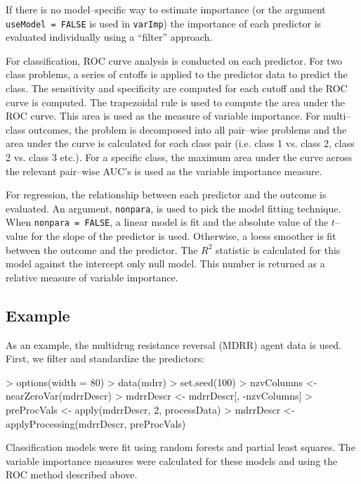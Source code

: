 \documentclass[12pt]{article}
\begin{document}
If there is no model--specific way to estimate importance (or the argument \texttt{useModel = FALSE} is used in \texttt{varImp}) the importance of each predictor is evaluated individually using a ``filter'' approach. 

For classification, ROC curve analysis is conducted on each predictor. For two class problems, a series of cutoffs is applied to the predictor data to predict the class. The sensitivity and specificity are computed for each cutoff and the ROC curve is computed. The trapezoidal rule is used to compute the area under the ROC curve. This area is used as the measure of variable importance. For multi--class outcomes, the problem is decomposed into all pair--wise problems and the area under the curve is calculated for each class pair (i.e. class 1 vs. class 2, class 2 vs. class 3 etc.). For a specific class, the maximum area under the curve across the relevant pair--wise AUC's is used as the variable importance measure.

For regression, the relationship between each predictor and the outcome is evaluated. An argument, \texttt{nonpara}, is used to pick the model fitting technique. When \texttt{nonpara = FALSE}, a linear model is fit and the absolute value of the $t$--value for the slope of the predictor is used. Otherwise, a loess smoother is fit between the outcome and the predictor. The $R^2$ statistic is calculated for this model against the intercept only null model. This number is returned as a relative measure of variable importance.


\subsection{Example}

As an example, the multidrug resistance reversal (MDRR) agent data is used. First, we filter and standardize the predictors:

\begin{Schunk}
\begin{Sinput}
> options(width = 80)
> data(mdrr)
> set.seed(100)
> nzvColumns <- nearZeroVar(mdrrDescr)
> mdrrDescr <- mdrrDescr[, -nzvColumns]
> preProcVals <- apply(mdrrDescr, 2, processData)
> mdrrDescr <- applyProcessing(mdrrDescr, preProcVals)
\end{Sinput}
\end{Schunk}

Classification models were fit using random forests and partial least squares. The variable importance measures were calculated for these models and using the ROC method described above. 
\end{document}
